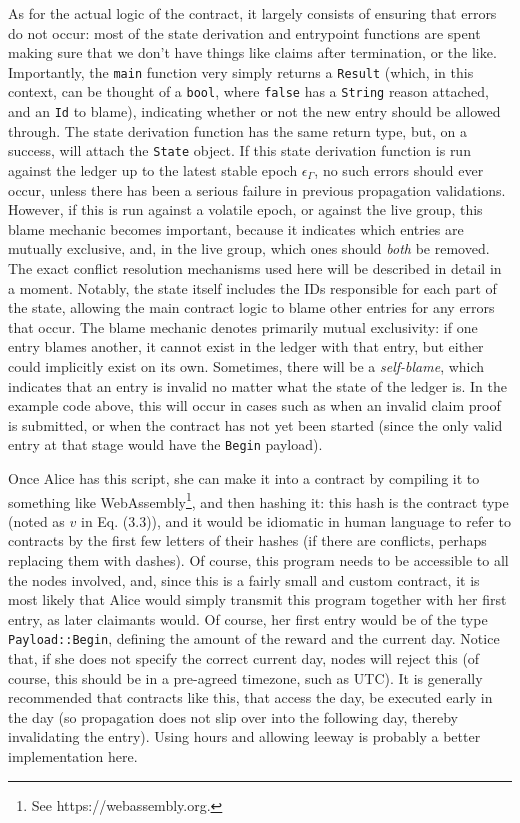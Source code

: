 \documentclass{extreport}
\begin{document}
As for the actual logic of the contract, it largely consists of ensuring that errors do not occur: most of the state derivation and entrypoint functions are spent making sure that we don't have things like claims after termination, or the like. Importantly, the \texttt{main} function very simply returns a \texttt{Result} (which, in this context, can be thought of a \texttt{bool}, where \texttt{false} has a \texttt{String} reason attached, and an \texttt{Id} to blame), indicating whether or not the new entry should be allowed through. The state derivation function has the same return type, but, on a success, will attach the \texttt{State} object. If this state derivation function is run against the ledger up to the latest stable epoch \(\epsilon_\Gamma\), no such errors should ever occur, unless there has been a serious failure in previous propagation validations. However, if this is run against a volatile epoch, or against the live group, this blame mechanic becomes important, because it indicates which entries are mutually exclusive, and, in the live group, which ones should \emph{both} be removed. The exact conflict resolution mechanisms used here will be described in detail in a moment. Notably, the state itself includes the IDs responsible for each part of the state, allowing the main contract logic to blame other entries for any errors that occur. The blame mechanic denotes primarily mutual exclusivity: if one entry blames another, it cannot exist in the ledger with that entry, but either could implicitly exist on its own. Sometimes, there will be a \emph{self-blame}, which indicates that an entry is invalid no matter what the state of the ledger is. In the example code above, this will occur in cases such as when an invalid claim proof is submitted, or when the contract has not yet been started (since the only valid entry at that stage would have the \texttt{Begin} payload).

Once Alice has this script, she can make it into a contract by compiling it to something like WebAssembly\footnote{See https://webassembly.org.}, and then hashing it: this hash is the contract type (noted as \(v\) in Eq. (3.3)), and it would be idiomatic in human language to refer to contracts by the first few letters of their hashes (if there are conflicts, perhaps replacing them with dashes). Of course, this program needs to be accessible to all the nodes involved, and, since this is a fairly small and custom contract, it is most likely that Alice would simply transmit this program together with her first entry, as later claimants would. Of course, her first entry would be of the type \texttt{Payload::Begin}, defining the amount of the reward and the current day. Notice that, if she does not specify the correct current day, nodes will reject this (of course, this should be in a pre-agreed timezone, such as UTC). It is generally recommended that contracts like this, that access the day, be executed early in the day (so propagation does not slip over into the following day, thereby invalidating the entry). Using hours and allowing leeway is probably a better implementation here.
\end{document}
